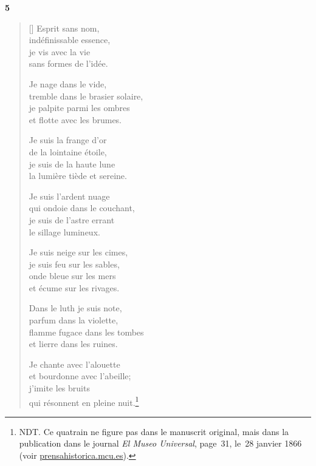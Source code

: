 \documentclass[a4paper,12pt]{book}
\begin{document}
\bigskip

\begin{center}
  \textbf{5}
\end{center}

\settowidth{\versewidth}{que tapissent de blanches perles,}

\begin{verse}[\versewidth]
  Esprit sans nom, \\
  indéfinissable essence, \\
  je vis avec la vie \\
  sans formes de l'idée.

  Je nage dans le vide, \\
  tremble dans le brasier solaire, \\
  je palpite parmi les ombres \\
  et flotte avec les brumes.

  Je suis la frange d'or \\
  de la lointaine étoile, \\
  je suis de la haute lune \\
  la lumière tiède et sereine.

  Je suis l'ardent nuage \\
  qui ondoie dans le couchant, \\
  je suis de l'astre errant \\
  le sillage lumineux.

  Je suis neige sur les cimes, \\
  je suis feu sur les sables, \\
  onde bleue sur les mers \\
  et écume sur les rivages.

  Dans le luth je suis note, \\
  parfum dans la violette, \\
  flamme fugace dans les tombes \\
  et lierre dans les ruines.

  Je chante avec l'alouette \\
  et bourdonne avec l'abeille; \\
  j'imite les bruits \\
  qui résonnent en pleine nuit.\footnote{NDT. Ce quatrain ne
figure pas dans le manuscrit original, mais dans la publication dans
le journal \emph{El Museo Universal}, page~31, le~28 janvier 1866 (voir \url{prensahistorica.mcu.es}).}


\end{verse}
\end{document}
